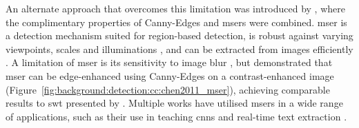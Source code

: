 An alternate approach that overcomes this limitation was introduced by \citet{Chen:2011ul}, where the complimentary properties of Canny-Edges \citep{Canny:1986uw} and \glspl{mser} \citep{Matas:2002tp} were combined. \gls{mser} is a detection mechanism suited for region-based detection, is robust against varying viewpoints, scales and illuminations \citep{Mikolajczyk:2005tb}, and can be extracted from images efficiently \citep{Nister:2008vk}. A limitation of \gls{mser} is its sensitivity to image blur \citep{Mikolajczyk:2005tb}, but \citeauthor{Chen:2011ul} demonstrated that \gls{mser} can be edge-enhanced using Canny-Edges on a contrast-enhanced image (Figure~\ref{fig:background:detection:cc:chen2011_mser}), achieving comparable results to \gls{swt} presented by \citet{Epshtein:2010tj}. Multiple works have utilised \glspl{mser} in a wide range of applications, such as their use in teaching \glspl{cnn} and real-time text extraction \cite{Li:2012wd,Gonzalez:2012wo,Kundu:2015vq,XiaomingHuang:2015fb,Zagoruyko:2015da}.

